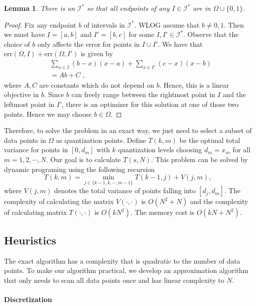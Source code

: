 \documentclass{article}
\newcommand{\err}{\ensuremath{\mathrm{err}}}
\newcommand{\setI}{\mathcal{I}}
\newtheorem*{lemma*}{Lemma}
\begin{document}
\begin{lemma*}
\label{lem:discrete-2}
There is an $\setI^*$ so that all endpoints of any $I \in \setI^*$ are in $\Omega \cup \{0, 1\}$.
\end{lemma*}



\begin{proof}
Fix any endpoint $b$ of intervals in $\setI^*$. WLOG assume that $b \neq 0, 1$. Then we must have $I = [a, b]$ and $I' = [b, c]$ for some $I, I' \in \setI^*$. Observe that the choice of $b$ only affects the error for points in $I \cup I'$. We have that $\err (\Omega, I) + \err (\Omega, I') $ is given by 
\begin{align*}
& \sum_{x \in I} (b - x) (x - a) + \sum_{x \in I'} (c -x)(x - b) \\
&= A b + C \; ,
\end{align*}
where $A, C$ are constants which do not depend on $b$. Hence, this is a linear objective in $b$. Since $b$ can freely range between the rightmost point in $I$ and the leftmost point in $I'$, there is an optimizer for this solution at one of those two points. Hence we may choose $b \in \Omega$.
\end{proof}


Therefore, to solve the problem in an exact way, we just need to select a subset of data points in $\Omega$ as quantization points. Define $T(k, m)$ be the optimal total variance for points in $[0, d_m]$ with $k$ quantization levels choosing $d_m=x_m$ for all $m=1,2,\cdots, N$. Our goal is to calculate $T(s, N)$. This problem can be solved by dynamic programing using the following recursion
\[
T(k, m) = \min_{j\in \{k-1, k, \cdots, m-1\}} T(k-1,j) + V(j,m),
\]
where $V(j,m)$ denotes the total variance of points falling into $[d_j, d_m]$. The complexity of calculating the matrix $V(\cdot, \cdot)$ is $O(N^2 + N)$ and the complexity of calculating matrix $T(\cdot, \cdot)$ is $O(kN^2)$. The  memory cost is $O(kN + N^2)$. 

\subsection{Heuristics}

The exact algorithm has a complexity that is quadratic to the number of data points. To make our algorithm practical,
we develop an approximation algorithm that only needs to scan all data points once and has linear complexity to $N$.

\paragraph*{Discretization}
\end{document}
